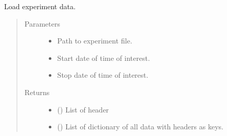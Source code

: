 \documentclass[letterpaper,10pt,english]{sphinxmanual}
\begin{document}
\begin{fulllineitems}
\label{\detokenize{NoSeMazeControl/Analysis:Analysis.Performance.load_data}}
\pysigstartsignatures
{}
\pysigstopsignatures
\sphinxAtStartPar
Load experiment data.
\begin{quote}\begin{description}
\item[{Parameters}] \leavevmode\begin{itemize}
\item {} 
\sphinxAtStartPar
{} \textendash{} Path to experiment file.

\item {} 
\sphinxAtStartPar
{} \textendash{} Start date of time of interest.

\item {} 
\sphinxAtStartPar
{} \textendash{} Stop date of time of interest.

\end{itemize}

\item[{Returns}] \leavevmode
\sphinxAtStartPar
\begin{itemize}
\item {} 
\sphinxAtStartPar
{} () \textendash{} List of header

\item {} 
\sphinxAtStartPar
{} () \textendash{} List of dictionary of all data with headers as keys.

\end{itemize}


\end{description}\end{quote}

\end{fulllineitems}
\end{document}
